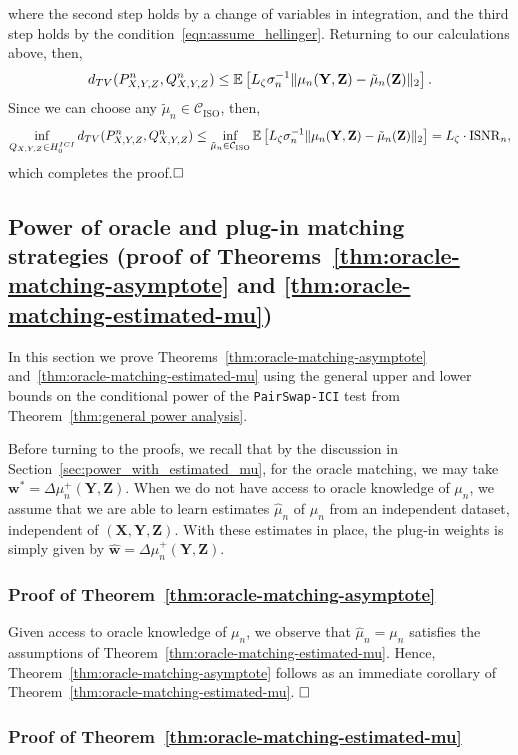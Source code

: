 \documentclass[12pt]{article}
\newcommand{\EE}[1]{\mathbb{E}\left[{#1}\right]}
\newcommand{\ISNR}{\mathrm{ISNR}}
\newcommand{\ISO}{\mathrm{ISO}}
\newcommand{\bX}{\mathbf{X}}
\newcommand{\bY}{\mathbf{Y}}
\newcommand{\bZ}{\mathbf{Z}}
\newcommand{\bw}{\mathbf{w}}
\newcommand{\TV}{\textnormal{d}_{\textnormal{TV}}}
\begin{document}
where the second step holds by a change of variables in integration, and the third step holds by the condition~\eqref{eqn:assume_hellinger}. Returning to our calculations above, then,
\[\TV(P^n_{X,Y,Z},Q^n_{X,Y,Z})  \leq \EE{L_\zeta \sigma_n^{-1} \|\mu_n(\bY,\bZ) - \tilde\mu_n(\bZ)\|_2}.\]
Since we can choose any $\tilde\mu_n\in \mathcal{C}_\ISO$, then,
\[\inf_{Q_{X,Y,Z}\in H_0^{\textnormal{ICI}}}\TV(P^n_{X,Y,Z},Q^n_{X,Y,Z})
\leq \inf_{\tilde\mu_n\in\mathcal{C}_\ISO}\EE{L_\zeta \sigma_n^{-1} \|\mu_n(\bY,\bZ) - \tilde\mu_n(\bZ)\|_2} = L_\zeta\cdot \ISNR_n,\]
which completes the proof.$\hfill{\square}$

\subsection{Power of oracle and plug-in matching strategies (proof of Theorems~\ref{thm:oracle-matching-asymptote} and \ref{thm:oracle-matching-estimated-mu})}\label{app:power-oracle}

In this section we prove Theorems~\ref{thm:oracle-matching-asymptote} and~\ref{thm:oracle-matching-estimated-mu} using the general upper and lower bounds on the conditional power of the \textnormal{\texttt{PairSwap-ICI}} test from Theorem~\ref{thm:general power analysis}.  

 Before turning to the proofs, we recall that by the discussion in Section~\ref{sec:power_with_estimated_mu}, for the oracle matching, we may take $\bw^* = \Delta\mu_n^+(\bY,\bZ)$.  When we do not have access to oracle knowledge of $\mu_n$, we assume that we are able to learn estimates $\hat\mu_n$ of $\mu_n$ from an independent dataset, independent of $(\bX,\bY,\bZ)$. With these estimates in place, the plug-in weights is simply given by $\hat{\bw}=\Delta\hat\mu_n^+(\bY,\bZ)$.




\subsubsection{Proof of Theorem~\ref{thm:oracle-matching-asymptote}}

Given access to oracle knowledge of $\mu_n$, we observe that $\hat{\mu}_n=\mu_n$ satisfies the assumptions of Theorem~\ref{thm:oracle-matching-estimated-mu}. Hence, Theorem~\ref{thm:oracle-matching-asymptote} follows as an immediate corollary of Theorem~\ref{thm:oracle-matching-estimated-mu}. $\hfill \Box$

\subsubsection{Proof of Theorem~\ref{thm:oracle-matching-estimated-mu}}\label{app:power-oracle-estimated}
\end{document}
